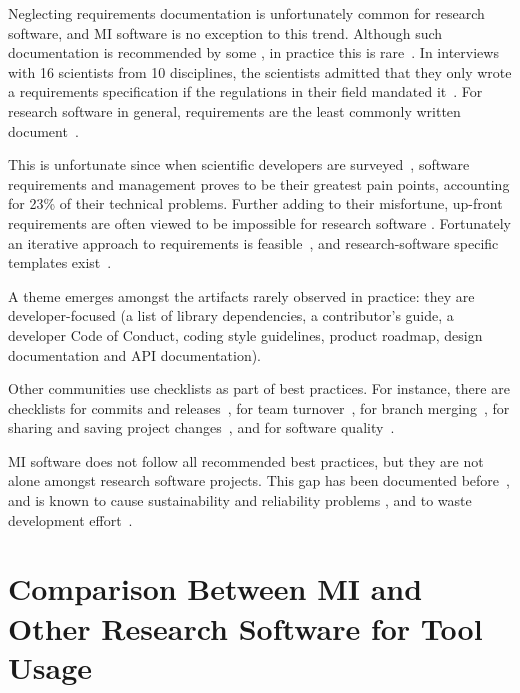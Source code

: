 \documentclass[doubleblind,12pt, 3p, times]{elsarticle}
\begin{document}
Neglecting requirements documentation is unfortunately common for research
software, and MI software is no exception to this trend.  Although such
documentation is recommended by some \cite{TobiasEtAl2018, HerouxEtAl2008,
SmithAndKoothoor2016}, in practice this is rare~\cite{HeatonAndCarver2015}.  In
interviews with 16 scientists from 10 disciplines, the scientists admitted that
they only wrote a requirements specification if the regulations in their field
mandated it~\cite{SandersAndKelly2008}.  For research software in general,
requirements are the least commonly written document~\cite{Nguyen-HoanEtAl2010}. 

This is unfortunate since when scientific developers are
surveyed~\cite{WieseEtAl2019}, software requirements and management proves to be
their greatest pain points, accounting for 23\% of their technical problems.
Further adding to their misfortune, up-front requirements are often viewed to be
impossible for research software \cite{CarverEtAl2007, SegalAndMorris2008}.
Fortunately an iterative approach to requirements is feasible~\cite{Smith2016},
and research-software specific templates exist~\cite{SmithEtAl2007}. 

A theme emerges amongst the artifacts rarely observed in practice: they
are developer-focused (a list of library dependencies, a contributor's guide,
a developer Code of Conduct, coding style guidelines, product roadmap, design
documentation and API documentation).

Other communities use checklists as part of best practices. For instance, there
are checklists for commits and releases~\cite{HerouxEtAl2008}, for team
turnover~\cite{HerouxAndBernholdt2018}, for branch merging~\cite{Brown2015}, for
sharing and saving project changes~\cite{WilsonEtAl2016}, and for software
quality~\cite{ThielEtAl2020, SSI2022}.

MI software does not follow all recommended best practices, but they are not
alone amongst research software projects. This gap has been documented
before~\cite{Storer2017,JohansonAndHasselbring2018}, and is known to cause
sustainability and reliability problems \cite{FaulkEtAl2009}, and to waste
development effort~\cite{deSouzaEtAl2019}.

\section{Comparison Between MI and Other Research Software for Tool Usage}
\label{Sec_CompareTools}
\end{document}
